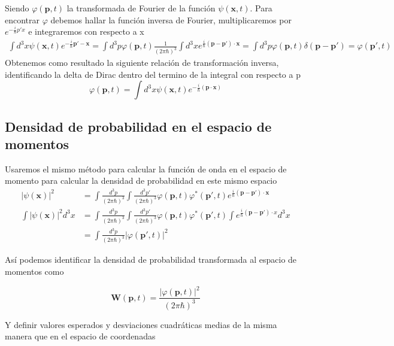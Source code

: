 \documentclass{report}
\begin{document}
Siendo $\varphi(\textbf{p},t)$ la transformada de Fourier de la función $\psi(\textbf{x},t)$. Para encontrar $\varphi$ debemos hallar la función inversa de Fourier, multiplicaremos por $e^{-\frac{i}{\hbar}p'x}$ e integraremos con respecto a x 
\begin{align*}
    \int d^3x \psi(\textbf{x},t)e^{-\frac{i}{\hbar}\textbf{p}'-\textbf{x}}=\int d^3p\varphi(\textbf{p},t) \frac{1}{(2\pi\hbar)^3}\int d^3x e^{\frac{i}{\hbar}(\textbf{p}-\textbf{p}')\cdot \textbf{x}}=\int d^3p \varphi(\textbf{p},t) \delta(\textbf{p}-\textbf{p}')=\varphi(\textbf{p}',t)
\end{align*}
Obtenemos como resultado la siguiente relación de transformación inversa, identificando la delta de Dirac dentro del termino de la integral con respecto a p
\begin{equation}\label{IFourier}
    \varphi(\textbf{p},t)=\int d^3x\psi(\textbf{x},t)e^{-\frac{i}{\hbar}(\textbf{p}\cdot\textbf{x})}
\end{equation}

\subsection{Densidad de probabilidad en el espacio de momentos}
Usaremos el mismo método para calcular la función de onda en el espacio de momento para calcular la densidad de probabilidad en este mismo espacio
\begin{align*}
\left\vert \psi(\textbf{x})\right\vert^2&=\int \frac{d^3 p}{(2 \pi \hbar)^3}\int \frac{d^3 p'}{(2 \pi \hbar)^3} \varphi(\textbf{p},t)\varphi^{\ast}(\textbf{p}',t) e^{\frac{i}{\hbar}(\textbf{p}-\textbf{p}')\cdot \textbf{x}}\\
\int \left\vert \psi(\textbf{x})\right\vert^2 d^3 x &= \int \frac{d^3 p}{(2 \pi \hbar)^3}\int \frac{d^3 p'}{(2 \pi \hbar)^3} \varphi(\textbf{p},t)\varphi^{\ast}(\textbf{p}',t)\int e^{\frac{i}{\hbar}(\textbf{p}-\textbf{p}')\cdot x} d^3 x\\
&=\int \frac{d^3 p}{(2 \pi\hbar)^3}\left\vert\varphi(\textbf{p}',t)\right\vert^2
\end{align*}

Así podemos identificar la densidad de probabilidad transformada al espacio de momentos como 

\begin{equation}
    \mathbf{W}(\textbf{p},t)=\frac{\left\vert\varphi(\textbf{p},t)\right\vert^2}{(2\pi\hbar)^3}
\end{equation}

Y definir valores esperados y desviaciones cuadráticas medias de la misma manera que en el espacio de coordenadas
\end{document}
